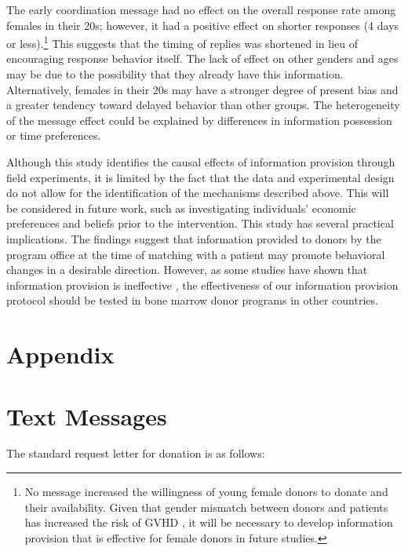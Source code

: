 \documentclass[12pt, a4paper]{article}
\begin{document}
The early coordination message had no effect on the overall response rate among females in their 20s; however, it had a positive effect on shorter responses (4 days or less).\footnote{No message increased the willingness of young female donors to donate and their availability. Given that gender mismatch between donors and patients has increased the risk of GVHD \citep{Loren2006, Nannya2011}, it will be necessary to develop information provision that is effective for female donors in future studies.} This suggests that the timing of replies was shortened in lieu of encouraging response behavior itself. The lack of effect on other genders and ages may be due to the possibility that they already have this information. Alternatively, females in their 20s may have a stronger degree of present bias and a greater tendency toward delayed behavior than other groups. The heterogeneity of the message effect could be explained by differences in information possession or time preferences.

Although this study identifies the causal effects of information provision through field experiments, it is limited by the fact that the data and experimental design do not allow for the identification of the mechanisms described above. This will be considered in future work, such as investigating individuals' economic preferences and beliefs prior to the intervention. This study has several practical implications. The findings suggest that information provided to donors by the program office at the time of matching with a patient may promote behavioral changes in a desirable direction. However, as some studies have shown that information provision is ineffective \citep[for example,][]{Switzer2018}, the effectiveness of our information provision protocol should be tested in bone marrow donor programs in other countries.

\clearpage

\appendix

\hypertarget{appendix}{%
\section*{Appendix}\label{appendix}}

\hypertarget{message}{%
\section{Text Messages}\label{message}}

The standard request letter for donation is as follows:
\end{document}
